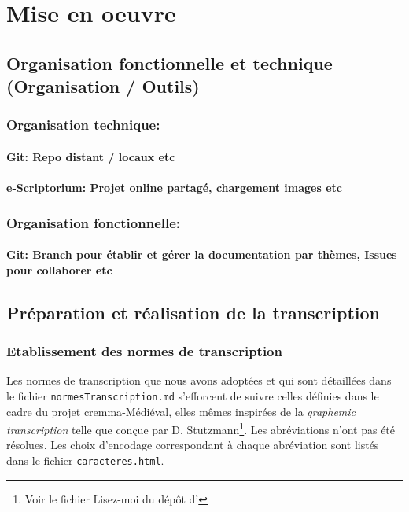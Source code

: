 \documentclass{article}
\begin{document}
\section{Mise en oeuvre}

\subsection{Organisation fonctionnelle et technique (Organisation / Outils)}

\subsubsection{Organisation technique:}
\paragraph{Git: Repo distant / locaux etc}
\paragraph{e-Scriptorium: Projet online partagé, chargement images etc}

\subsubsection{Organisation fonctionnelle:}
\paragraph{Git: Branch pour établir et gérer la documentation par thèmes, Issues pour collaborer etc}

\subsection{Préparation et réalisation de la transcription}
\subsubsection{Etablissement des normes de transcription}
Les normes de transcription que nous avons adoptées et qui sont détaillées dans le fichier \texttt{normesTranscription.md} s'efforcent de suivre celles définies dans le cadre du projet \gls{cremma}-Médiéval, elles mêmes inspirées de la \textit{graphemic transcription} telle que conçue par D. Stutzmann\footnote{Voir le fichier Lisez-moi du dépôt d'\cite{pincheCREMMAMedievalOld2021}}. Les abréviations n'ont pas été résolues. Les choix d'encodage correspondant à chaque abréviation sont listés dans le fichier \texttt{caracteres.html}.
\end{document}
